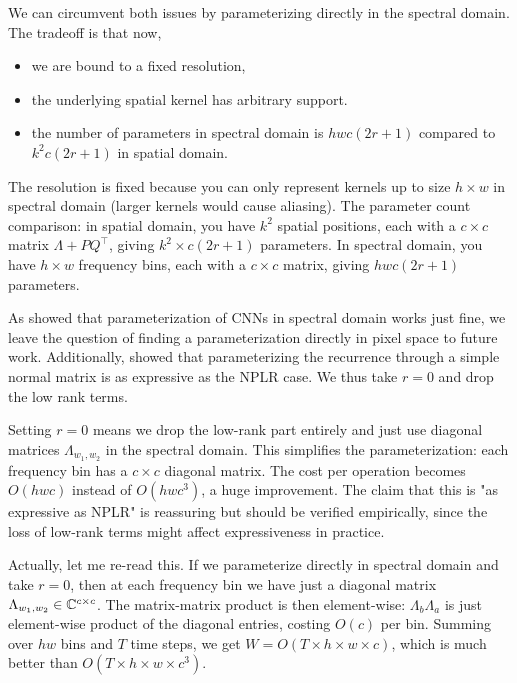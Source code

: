 We can circumvent both issues by parameterizing directly in the spectral domain. The tradeoff is that now,
\begin{itemize}
    \item we are bound to a fixed resolution,
    \item the underlying spatial kernel has arbitrary support.
    \item the number of parameters in spectral domain is $hwc(2r+1)$ compared to $k^2c(2r+1)$ in spatial domain.
\end{itemize}

\begin{ThomasAnnotation}
The resolution is fixed because you can only represent kernels up to size $h \times w$ in spectral domain (larger kernels would cause aliasing). The parameter count comparison: in spatial domain, you have $k^2$ spatial positions, each with a $c \times c$ matrix $\Lambda + PQ^\top$, giving $k^2 \times c(2r+1)$ parameters. In spectral domain, you have $h \times w$ frequency bins, each with a $c \times c$ matrix, giving $hwc(2r+1)$ parameters.
\end{ThomasAnnotation}

As \citet{TODO:franck} showed that parameterization of CNNs in spectral domain works just fine, we leave the question of finding a parameterization directly in pixel space to future work. Additionally, \citet{TODO} showed that parameterizing the recurrence through a simple normal matrix is as expressive as the NPLR case. We thus take $r=0$ and drop the low rank terms.

\begin{ThomasAnnotation}
Setting $r=0$ means we drop the low-rank part entirely and just use diagonal matrices $\Lambda_{w_1, w_2}$ in the spectral domain. This simplifies the parameterization: each frequency bin has a $c \times c$ diagonal matrix. The cost per operation becomes $O(hwc)$ instead of $O(hwc^3)$, a huge improvement. The claim that this is "as expressive as NPLR" is reassuring but should be verified empirically, since the loss of low-rank terms might affect expressiveness in practice.

Actually, let me re-read this. If we parameterize directly in spectral domain and take $r=0$, then at each frequency bin we have just a diagonal matrix $\Lambda_{w_1, w_2} \in \mathbb{C}^{c \times c}$. The matrix-matrix product is then element-wise: $\Lambda_b \Lambda_a$ is just element-wise product of the diagonal entries, costing $O(c)$ per bin. Summing over $hw$ bins and $T$ time steps, we get $W = O(T \times h \times w \times c)$, which is much better than $O(T \times h \times w \times c^3)$.
\end{ThomasAnnotation}

